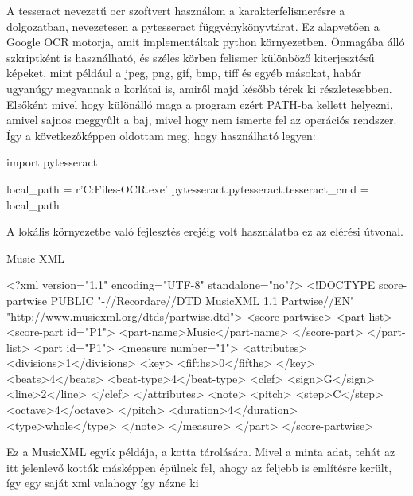 A tesseract nevezetű ocr szoftvert használom a karakterfelismerésre a dolgozatban, nevezetesen a pytesseract függvénykönyvtárat. Ez alapvetően a Google OCR motorja, amit implementáltak python környezetben. Önmagába álló szkriptként is használható, és széles körben felismer különböző kiterjesztésű képeket, mint például a jpeg, png, gif, bmp, tiff és egyéb másokat, habár ugyanúgy megvannak a korlátai is, amiről majd később térek ki részletesebben. Elsőként mivel hogy különálló maga a program ezért PATH-ba kellett helyezni, amivel sajnos meggyűlt a baj, mivel hogy nem ismerte fel az operációs rendszer. Így a következőképpen oldottam meg, hogy használható legyen:
\begin{python}
import pytesseract
	
local_path =  r'C:\Program Files\Tesseract-OCR\tesseract.exe'
pytesseract.pytesseract.tesseract_cmd = local_path
\end{python}
A lokális környezetbe való fejlesztés erejéig volt használatba ez az elérési útvonal.

\begin{large}
	Music XML
\end{large}
\begin{xml}
<?xml version="1.1" encoding="UTF-8" standalone="no"?>
<!DOCTYPE score-partwise PUBLIC
"-//Recordare//DTD MusicXML 1.1 Partwise//EN"
"http://www.musicxml.org/dtds/partwise.dtd">
  <score-partwise>
    <part-list>
      <score-part id="P1">
        <part-name>Music</part-name>
      </score-part>
    </part-list>
    <part id="P1">
      <measure number="1">
        <attributes>
          <divisions>1</divisions>
          <key>
            <fifths>0</fifths>
          </key>
          <beats>4</beats>
          <beat-type>4</beat-type>
          <clef>
            <sign>G</sign>
            <line>2</line>
          </clef>
        </attributes>
        <note>
          <pitch>
            <step>C</step>
            <octave>4</octave>
          </pitch>
          <duration>4</duration>
          <type>whole</type>
        </note>
      </measure>
    </part>
  </score-partwise>
\end{xml}

Ez a MusicXML egyik példája, a kotta tárolására. Mivel a minta adat, tehát az itt jelenlevő kották másképpen épülnek fel, ahogy az feljebb is említésre került, így egy saját xml valahogy így nézne ki

